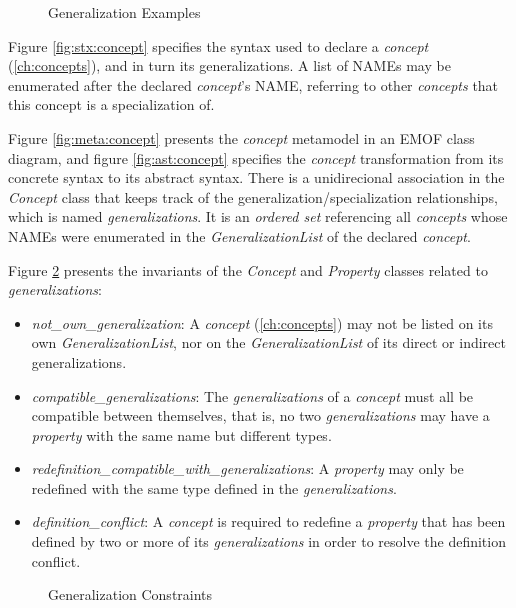 \begin{figure}
\verbatimfont{\small}

\caption{Generalization Examples}
\label{fig:ex:generalization}
\end{figure}

\begin{concrete-syntax}
Figure \ref{fig:stx:concept} specifies the syntax used
to declare a \emph{concept} (\ref{ch:concepts}),
and in turn its generalizations.
A list of NAMEs may be enumerated after the declared \emph{concept}'s NAME,
referring to other \emph{concepts} that this concept is a specialization of.
\end{concrete-syntax}

\begin{abstract-syntax}
Figure \ref{fig:meta:concept} presents the \emph{concept} metamodel
in an EMOF \cite{mof} class diagram,
and figure \ref{fig:ast:concept} specifies
the \emph{concept} transformation
from its concrete syntax to its abstract syntax.
There is a unidirecional association in the \emph{Concept} class
that keeps track of the generalization/specialization relationships,
which is named \emph{generalizations}.
It is an \emph{ordered set} referencing all \emph{concepts}
whose NAMEs were enumerated in the \emph{GeneralizationList}
of the declared \emph{concept}.
\end{abstract-syntax}

\begin{constraints}
Figure \ref{fig:ocl:generalization} presents the invariants
of the \emph{Concept} and \emph{Property} classes
related to \emph{generalizations}:

\begin{itemize}

\item \emph{not\_own\_generalization}:
A \emph{concept} (\ref{ch:concepts}) may not be listed on its own \emph{GeneralizationList},
nor on the \emph{GeneralizationList} of its direct or indirect generalizations.

\item \emph{compatible\_generalizations}:
The \emph{generalizations} of a \emph{concept} must all be compatible between themselves,
that is, no two \emph{generalizations} may have a \emph{property} with the same name
but different types.

\item \emph{redefinition\_compatible\_with\_generalizations}:
A \emph{property} may only be redefined with the same type defined in the \emph{generalizations}.

\item \emph{definition\_conflict}:
A \emph{concept} is required to redefine a \emph{property} that 
has been defined by two or more of its \emph{generalizations}
in order to resolve the definition conflict.

\end{itemize}
\end{constraints}

\begin{figure}

\caption{Generalization Constraints}
\label{fig:ocl:generalization}
\end{figure}
